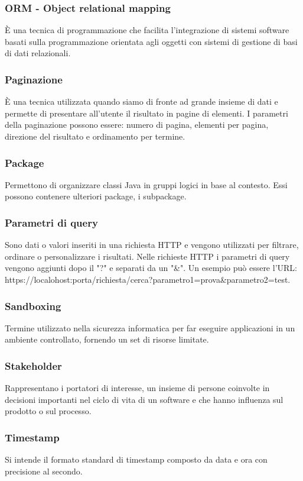 \subsubsection*{ORM - Object relational mapping}
È una tecnica di programmazione che facilita l'integrazione di sistemi software basati sulla programmazione orientata agli oggetti con sistemi di gestione di basi di dati relazionali.
\subsubsection*{Paginazione}
È una tecnica utilizzata quando siamo di fronte ad grande insieme di dati e permette di presentare all'utente il risultato in pagine di elementi. I parametri della paginazione possono essere: numero di pagina, elementi per pagina, direzione del risultato e ordinamento per termine.
\subsubsection*{Package}
Permettono di organizzare classi Java in gruppi logici in base al contesto. Essi possono contenere ulteriori package, i subpackage.
\subsubsection*{Parametri di query}
Sono dati o valori inseriti in una richiesta HTTP e vengono utilizzati per filtrare, ordinare o personalizzare i risultati. Nelle richieste HTTP i parametri di query vengono aggiunti dopo il "?" e separati da un "\&". Un esempio può essere l'URL: https://localohost:porta/richiesta/cerca?parametro1=prova\&parametro2=test.
\subsubsection*{Sandboxing}
Termine utilizzato nella sicurezza informatica per far eseguire applicazioni in un ambiente controllato, fornendo un set di risorse limitate.
\subsubsection*{Stakeholder}
Rappresentano i portatori di interesse, un insieme di persone coinvolte in decisioni importanti nel ciclo di vita di un software e che hanno influenza sul prodotto o sul processo.
\subsubsection*{Timestamp}
Si intende il formato standard di timestamp composto da data e ora con precisione al secondo.
